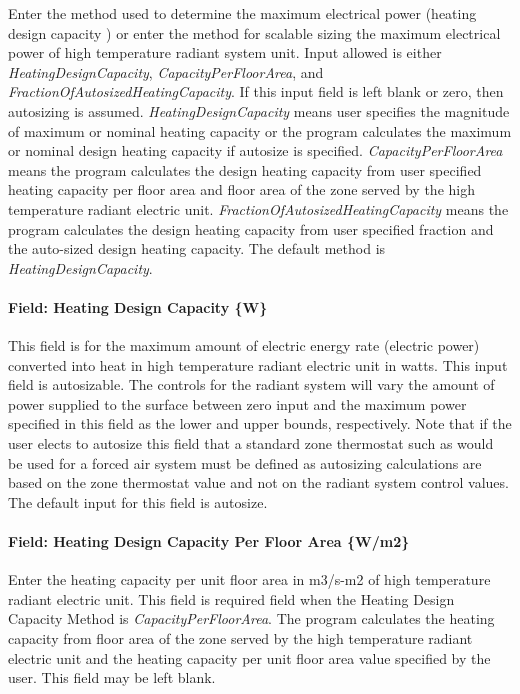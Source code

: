 Enter the method used to determine the maximum electrical power (heating design capacity ) or enter the method for scalable sizing the maximum electrical power of high temperature radiant system unit. Input allowed is either \emph{HeatingDesignCapacity}, \emph{CapacityPerFloorArea}, and \emph{FractionOfAutosizedHeatingCapacity}. If this input field is left blank or zero, then autosizing is assumed. \emph{HeatingDesignCapacity} means user specifies the magnitude of maximum or nominal heating capacity or the program calculates the maximum or nominal design heating capacity if autosize is specified. \emph{CapacityPerFloorArea} means the program calculates the design heating capacity from user specified heating capacity per floor area and floor area of the zone served by the high temperature radiant electric unit. \emph{FractionOfAutosizedHeatingCapacity} means the program calculates the design heating capacity from user specified fraction and the auto-sized design heating capacity. The default method is \emph{HeatingDesignCapacity}.

\paragraph{Field: Heating Design Capacity \{W\}}\label{field-heating-design-capacity-w-7}

This field is for the maximum amount of electric energy rate (electric power) converted into heat in high temperature radiant electric unit in watts. This input field is autosizable. The controls for the radiant system will vary the amount of power supplied to the surface between zero input and the maximum power specified in this field as the lower and upper bounds, respectively. Note that if the user elects to autosize this field that a standard zone thermostat such as would be used for a forced air system must be defined as autosizing calculations are based on the zone thermostat value and not on the radiant system control values. The default input for this field is autosize.

\paragraph{Field: Heating Design Capacity Per Floor Area \{W/m2\}}\label{field-heating-design-capacity-per-floor-area-wm2-7}

Enter the heating capacity per unit floor area in m3/s-m2 of high temperature radiant electric unit. This field is required field when the Heating Design Capacity Method is \emph{CapacityPerFloorArea}. The program calculates the heating capacity from floor area of the zone served by the high temperature radiant electric unit and the heating capacity per unit floor area value specified by the user. This field may be left blank.

